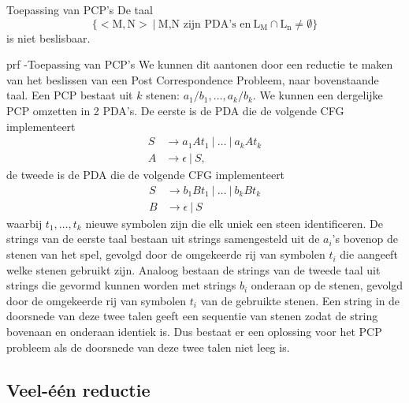 \vspace{0.5cm}

\begin{lem}{Toepassing van PCP's}
    De taal 
    \begin{equation*}
        \{ < \text{M}, \text{N} > \ | \ \text{M,N zijn PDA's en} \ \text{L}_{\text{M}} \cap \text{L}_{\text{n}} \neq \emptyset \}
    \end{equation*}
    is niet beslisbaar.
\end{lem}

\newpage

\begin{prf}{prf -Toepassing van PCP's}
    We kunnen dit aantonen door een reductie te maken van het beslissen van een Post Correspondence Probleem, naar bovenstaande taal. Een PCP bestaat uit $k$ stenen: $a_1/b_1, \ldots, a_k/b_k$. We kunnen een dergelijke PCP omzetten in 2 PDA's. De eerste is de PDA die de volgende CFG implementeert
    \begin{align*}
        S &\to a_1 A t_1 \ | \ \ldots \ | \ a_k A t_k \\
        A &\to \epsilon \ | \ S,
    \end{align*}
    de tweede is de PDA die de volgende CFG implementeert
    \begin{align*}
        S &\to b_1 B t_1 \ | \ \ldots \ | \ b_k B t_k \\
        B &\to \epsilon \ | \ S
    \end{align*}
    waarbij $t_1, \ldots, t_k$ nieuwe symbolen zijn die elk uniek een steen identificeren. De strings van de eerste taal bestaan uit strings samengesteld uit de $a_i$'s bovenop de stenen van het spel, gevolgd door de omgekeerde rij van symbolen $t_i$ die aangeeft welke stenen gebruikt zijn. Analoog bestaan de strings van de tweede taal uit strings die gevormd kunnen worden met strings $b_i$ onderaan op de stenen, gevolgd door de omgekeerde rij van symbolen $t_i$ van de gebruikte stenen. Een string in de doorsnede van deze twee talen geeft een sequentie van stenen zodat de string bovenaan en onderaan identiek is. Dus bestaat er een oplossing voor het PCP probleem als de doorsnede van deze twee talen niet leeg is.
\end{prf}

\subsection{Veel-één reductie}

